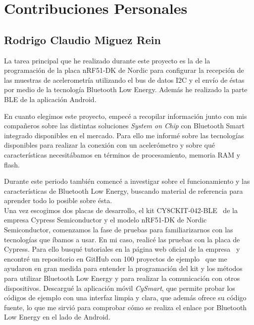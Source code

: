 \newpage %

\section{Contribuciones Personales}
\label{makereference1.4}

\subsection{Rodrigo Claudio Miguez Rein}

La tarea principal que he realizado durante este proyecto es la de la programación de la placa nRF51-DK de Nordic para configurar la recepción de las muestras de acelerometría utilizando el bus de datos I2C y el envío de éstas por medio de la tecnología Bluetooth Low Energy. Además he realizado la parte BLE de la aplicación Android.

En cuanto elegimos este proyecto, empecé a recopilar información junto con mis compañeros sobre las distintas soluciones \textit{System on Chip} con Bluetooth Smart integrado disponibles en el mercado. Para ello me informé sobre las tecnologías disponibles para realizar la conexión con un acelerómetro y sobre qué características necesitábamos en términos de procesamiento, memoria RAM y flash.

Durante este periodo también comencé a investigar sobre el funcionamiento y las características de Bluetooth Low Energy, buscando material de referencia para aprender todo lo posible sobre ésta.\\

Una vez escogimos dos placas de desarrollo, el kit CY8CKIT-042-BLE~\cite{CypressDatasheet} de la empresa Cypress Semiconductor y el modelo nRF51-DK de Nordic Semiconductor, comenzamos la fase de pruebas para familiarizarnos con las tecnologías que íbamos a usar. En mi caso, realicé las pruebas con la placa de Cypress. Para ello busqué tutoriales en la página web oficial de la empresa~\cite{CypressTutorials} y encontré un repositorio en GitHub con 100 proyectos de ejemplo~\cite{100Projects} que me ayudaron en gran medida para entender la programación del kit y los métodos para utilizar Bluetooth Low Energy y para realizar la comunicación con otros dispositivos. Descargué la aplicación móvil \textit{CySmart}, que permite probar los códigos de ejemplo con una interfaz limpia y clara, que además ofrece su código fuente, lo que me sirvió para comprobar cómo se realiza el enlace por Bluetooth Low Energy en el lado de Android.

